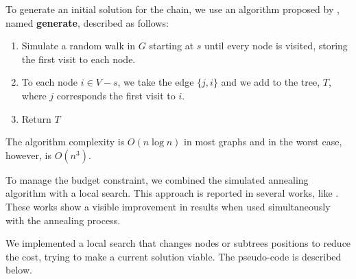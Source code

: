 \documentclass[12pt]{article}
\begin{document}
To generate an initial solution for the chain, we use an algorithm proposed by \cite{broder1989generating}, named \textbf{generate}, described as follows:
\vspace{0.3cm}
\begin{enumerate}
    \item Simulate a random walk in $G$ starting at $s$ until every node is visited, storing the first visit to each node.
    \item To each node $i \in V-s$, we take the edge $\{j,i\}$ and we add to the tree, $T$, where $j$ corresponds the first visit to $i$.
    \item Return $T$
\end{enumerate}
\vspace{0.3cm}
The algorithm complexity is $O(n\log{n})$ in most graphs and in the worst case, however, is $O(n^3)$.

To manage the budget constraint, we combined the simulated annealing algorithm with a local search. This approach is reported in several works, like \cite{Martin1996}. These works show a visible improvement in results when used simultaneously with the annealing process. 

We implemented a local search that changes nodes or subtrees positions to reduce the cost, trying to make a current solution viable. The pseudo-code is described below.

    
\end{document}

